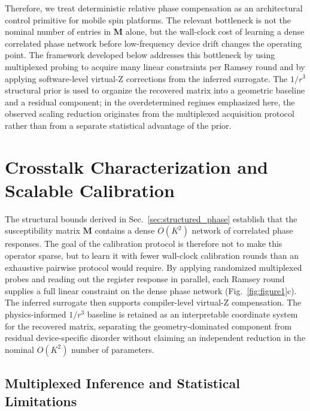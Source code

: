 \documentclass[a4paper,twocolumn,11pt]{quantumarticle}
\begin{document}
Therefore, we treat deterministic relative phase compensation as an architectural control primitive for mobile spin platforms. The relevant bottleneck is not the nominal number of entries in $\mathbf{M}$ alone, but the wall-clock cost of learning a dense correlated phase network before low-frequency device drift changes the operating point. The framework developed below addresses this bottleneck by using multiplexed probing to acquire many linear constraints per Ramsey round and by applying software-level virtual-Z corrections from the inferred surrogate. The $1/r^3$ structural prior is used to organize the recovered matrix into a geometric baseline and a residual component; in the overdetermined regimes emphasized here, the observed scaling reduction originates from the multiplexed acquisition protocol rather than from a separate statistical advantage of the prior.

\section{Crosstalk Characterization and Scalable Calibration}
\label{sec:learning}

The structural bounds derived in Sec.~\ref{sec:structured_phase} establish that the susceptibility matrix $\mathbf{M}$ contains a dense $O(K^2)$ network of correlated phase responses. The goal of the calibration protocol is therefore not to make this operator sparse, but to learn it with fewer wall-clock calibration rounds than an exhaustive pairwise protocol would require.
By applying randomized multiplexed probes and reading out the register response in parallel, each Ramsey round supplies a full linear constraint on the dense phase network (Fig.~\ref{fig:figure1}c). The inferred surrogate then supports compiler-level virtual-Z compensation. The physics-informed $1/r^3$ baseline is retained as an interpretable coordinate system for the recovered matrix, separating the geometry-dominated component from residual device-specific disorder without claiming an independent reduction in the nominal $O(K^2)$ number of parameters.

\subsection{Multiplexed Inference and Statistical Limitations}
\label{sec:multiplexed_inference}
\end{document}
